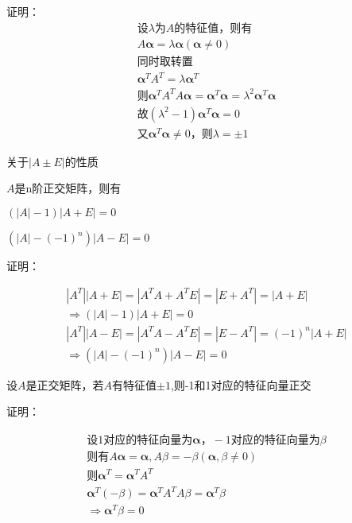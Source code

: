 \documentclass[lang=cn,10pt]{elegantbook}
\begin{document}
证明：
\begin{equation*}
	\begin{split}
		\text{设}\lambda \text{为}A\text{的特征值，则有}
		\\
		A\boldsymbol{\alpha }=\lambda \boldsymbol{\alpha }\left( \boldsymbol{\alpha }\ne 0 \right) 
		\\
		\text{同时取转置}
		\\
		\boldsymbol{\alpha }^TA^T=\lambda \boldsymbol{\alpha }^T
		\\
		\text{则}\boldsymbol{\alpha }^TA^TA\boldsymbol{\alpha }=\boldsymbol{\alpha }^T\boldsymbol{\alpha }=\lambda ^2\boldsymbol{\alpha }^T\boldsymbol{\alpha }
		\\
		\text{故}\left( \lambda ^2-1 \right) \boldsymbol{\alpha }^T\boldsymbol{\alpha }=0
		\\
		\text{又}\boldsymbol{\alpha }^T\boldsymbol{\alpha }\ne 0\text{，则}\lambda =\pm 1
	\end{split}
\end{equation*}

\begin{conclusion}
	关于$|A\pm E|$的性质
	
	$A$是n阶正交矩阵，则有
	
	$(|A|-1)|A+E|=0$
	
	$(|A|-(-1)^{n})|A-E|=0$
\end{conclusion}

证明：

\begin{equation*}
	\begin{split}
		|A^T||A+E|=|A^TA+A^TE|=|E+A^T|=|A+E|
		\\
		\Rightarrow \left( |A|-1 \right) |A+E|=0
		\\
		|A^T||A-E|=|A^TA-A^TE|=|E-A^T|=\left( -1 \right) ^n|A+E|
		\\
		\Rightarrow \left( |A|-\left( -1 \right) ^n \right) |A-E|=0
	\end{split}
\end{equation*}

\begin{conclusion}
	设$A$是正交矩阵，若$A$有特征值$\pm 1$,则-1和1对应的特征向量正交
\end{conclusion}

证明：

\begin{equation*}
	\begin{split}
		\text{设}1\text{对应的特征向量为}\boldsymbol{\alpha }\text{，}-1\text{对应的特征向量为}\beta 
		\\
		\text{则有}A\boldsymbol{\alpha }=\boldsymbol{\alpha },A\beta =-\beta \left( \boldsymbol{\alpha },\beta \ne 0 \right) 
		\\
		\text{则}\boldsymbol{\alpha }^T=\boldsymbol{\alpha }^TA^T
		\\
		\boldsymbol{\alpha }^T\left( -\beta \right) =\boldsymbol{\alpha }^TA^TA\beta =\boldsymbol{\alpha }^T\beta 
		\\
		\Rightarrow \boldsymbol{\alpha }^T\beta =0
	\end{split}
\end{equation*}
\end{document}
